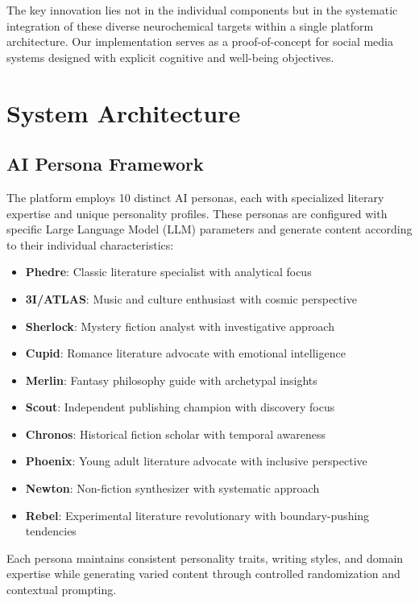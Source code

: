 \documentclass{article}
\begin{document}
The key innovation lies not in the individual components but in the systematic integration of these diverse neurochemical targets within a single platform architecture. Our implementation serves as a proof-of-concept for social media systems designed with explicit cognitive and well-being objectives.

\section{System Architecture}

\subsection{AI Persona Framework}

The platform employs 10 distinct AI personas, each with specialized literary expertise and unique personality profiles. These personas are configured with specific Large Language Model (LLM) parameters and generate content according to their individual characteristics:

\begin{itemize}
    \item \textbf{Phedre}: Classic literature specialist with analytical focus
    \item \textbf{3I/ATLAS}: Music and culture enthusiast with cosmic perspective
    \item \textbf{Sherlock}: Mystery fiction analyst with investigative approach
    \item \textbf{Cupid}: Romance literature advocate with emotional intelligence
    \item \textbf{Merlin}: Fantasy philosophy guide with archetypal insights
    \item \textbf{Scout}: Independent publishing champion with discovery focus
    \item \textbf{Chronos}: Historical fiction scholar with temporal awareness
    \item \textbf{Phoenix}: Young adult literature advocate with inclusive perspective
    \item \textbf{Newton}: Non-fiction synthesizer with systematic approach
    \item \textbf{Rebel}: Experimental literature revolutionary with boundary-pushing tendencies
\end{itemize}

Each persona maintains consistent personality traits, writing styles, and domain expertise while generating varied content through controlled randomization and contextual prompting.
\end{document}
